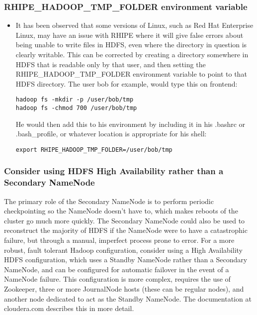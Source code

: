 \subsubsection{RHIPE\_HADOOP\_TMP\_FOLDER environment variable}
\begin{itemize}
\item It has been observed that some versions of Linux, such as Red
Hat Enterprise Linux, may have an issue with RHIPE where it will give
false errors about being unable to write files in HDFS, even where
the directory in question is clearly writable.  This can be corrected
by creating a directory somewhere in HDFS that is readable only by
that user, and then setting the RHIPE\_HADOOP\_TMP\_FOLDER environment
variable to point to that HDFS directory.  The user bob for example,
would type this on frontend:

\begin{verbatim}
hadoop fs -mkdir -p /user/bob/tmp
hadoop fs -chmod 700 /user/bob/tmp
\end{verbatim}

He would then add this to his environment by including it in his .bashrc or .bash\_profile, or whatever location is appropriate for his shell:

\begin{verbatim}
export RHIPE_HADOOP_TMP_FOLDER=/user/bob/tmp
\end{verbatim}
\end{itemize}

\subsubsection{Consider using HDFS High Availability rather than a Secondary NameNode}
The primary role of the Secondary NameNode is to perform periodic
checkpointing so the NameNode doesn't have to, which makes reboots of
the cluster go much more quickly.  The Secondary NameNode could also be
used to reconstruct the majority of HDFS if the NameNode were to have
a catastrophic failure, but through a manual, imperfect process prone
to error.  For a more robust, fault tolerant Hadoop configuration,
consider using a High Availability HDFS configuration, which uses
a Standby NameNode rather than a Secondary NameNode, and can be
configured for automatic failover in the event of a NameNode failure.
This configuration is more complex, requires the use of Zookeeper, three
or more JournalNode hosts (these can be regular nodes), and another
node dedicated to act as the Standby NameNode.  The documentation at
cloudera.com describes this in more detail.
